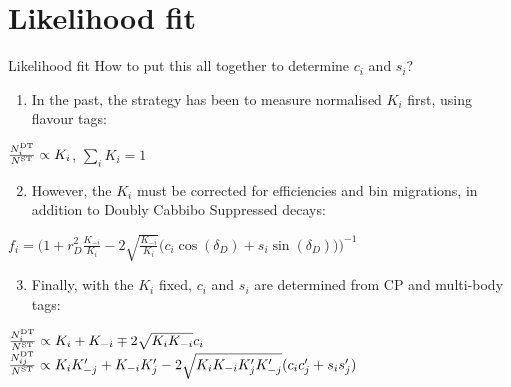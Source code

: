 \documentclass{beamer}
\begin{document}
\section{Likelihood fit}
\begin{frame}{Likelihood fit}
  \vspace{0.0cm}
  {\Large How to put this all together to determine $c_i$ and $s_i$?}
  \begin{enumerate}
    \item{In the past, the strategy has been to measure normalised $K_i$ first, using flavour tags:}
  \end{enumerate}
  \begin{center}
    $\frac{N^{\rm DT}_i}{N^{\rm ST}}\propto K_i$, \quad$\sum_iK_i = 1$
  \end{center}
  \begin{enumerate}
    \setcounter{enumi}{1}
    \item{However, the $K_i$ must be corrected for efficiencies and bin migrations, in addition to Doubly Cabbibo Suppressed decays:}
  \end{enumerate}
  \begin{center}
    $f_i = \Big(1 + r_D^2\frac{K_{-i}}{K_i} - 2\sqrt{\frac{K_{-i}}{K_i}}\big(c_i\cos(\delta_D) + s_i\sin(\delta_D)\big)\Big)^{-1}$
  \end{center}
  \begin{enumerate}
    \setcounter{enumi}{2}
    \item{Finally, with the $K_i$ fixed, $c_i$ and $s_i$ are determined from CP and multi-body tags:}
  \end{enumerate}
  \begin{center}
    $\frac{N^{\rm DT}_i}{N^{\rm ST}}\propto K_i + K_{-i} \mp 2\sqrt{K_iK_{-i}}c_i$\\
    $\frac{N^{\rm DT}_{ij}}{N^{\rm ST}}\propto K_iK_{-j}^\prime + K_{-i}K_j^\prime - 2\sqrt{K_iK_{-i}K_j^\prime K_{-j}^\prime}(c_ic_j^\prime + s_is_j^\prime)$
  \end{center}
\end{frame}
\end{document}
